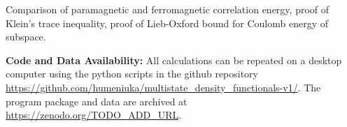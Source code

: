\documentclass[journal=jpclcd,manuscript=letter]{achemso}
\begin{document}
\begin{suppinfo}
Comparison of paramagnetic and ferromagnetic correlation energy,
proof of Klein's trace inequality,
proof of Lieb-Oxford bound for Coulomb energy of subspace.

\textbf{Code and Data Availability:}
All calculations can be repeated on a desktop computer using the python scripts
in the github repository
\url{https://github.com/humeniuka/multistate_density_functionals-v1/}.
The program package and data are archived at \url{https://zenodo.org/TODO_ADD_URL}.

\end{suppinfo}


\end{document}
